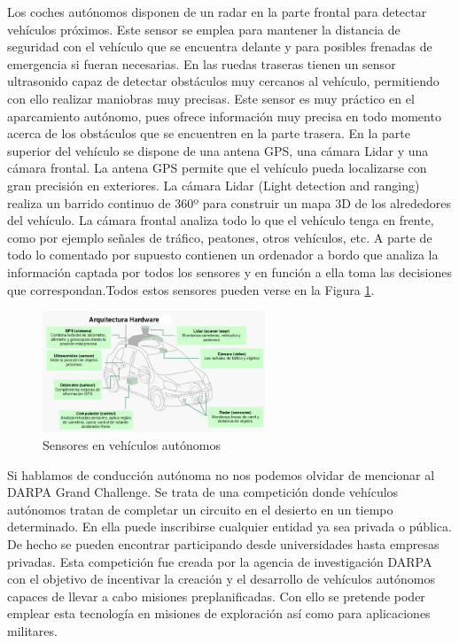 Los coches autónomos disponen de un radar en la parte frontal para detectar vehículos próximos. Este sensor se emplea para mantener la distancia de seguridad con el vehículo que se encuentra delante y para posibles frenadas de emergencia si fueran necesarias. En las ruedas traseras tienen un sensor ultrasonido capaz de detectar obstáculos muy cercanos al vehículo, permitiendo con ello realizar maniobras muy precisas. Este sensor es muy práctico en el aparcamiento autónomo, pues ofrece información muy precisa en todo momento acerca de los obstáculos que se encuentren en la parte trasera. En la parte superior del vehículo se dispone de una antena GPS, una cámara Lidar y una cámara frontal. La antena GPS permite que el vehículo pueda localizarse con gran precisión en exteriores. La cámara Lidar (Light detection and ranging) realiza un barrido continuo de 360º para construir un mapa 3D de los alrededores del vehículo. La cámara frontal analiza todo lo que el vehículo tenga en frente, como por ejemplo señales de tráfico, peatones, otros vehículos, etc. A parte de todo lo comentado por supuesto contienen un ordenador a bordo que analiza la información captada por todos los sensores y en función a ella toma las decisiones que correspondan.Todos estos sensores pueden verse en la Figura \ref{fig.coche_autonomo}.

\begin{figure}[H]
  \begin{center}
    \includegraphics[width=0.6\textwidth]{figures/Introduccion/coche_autonomo.png}
		\caption{ Sensores en vehículos autónomos}
		\label{fig.coche_autonomo}
		\end{center}
\end{figure}

Si hablamos de conducción autónoma no nos podemos olvidar de mencionar al DARPA Grand Challenge. Se trata de una competición donde vehículos autónomos tratan de completar un circuito en el desierto en un tiempo determinado. En ella puede inscribirse cualquier entidad ya sea privada o pública. De hecho se pueden encontrar participando desde universidades hasta empresas privadas. Esta competición fue creada por la agencia de investigación DARPA con el objetivo de incentivar la creación y el desarrollo de vehículos autónomos capaces de  llevar a cabo misiones preplanificadas. Con ello se pretende poder emplear esta tecnología en misiones de exploración así como para aplicaciones militares.


